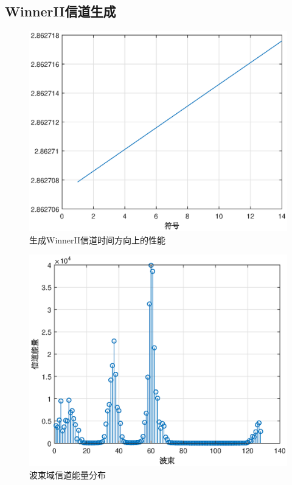 \documentclass{article}
\begin{document}
\subsection{WinnerII信道生成}
\begin{figure}[H]
	\centering
	\includegraphics[width = .7\textwidth]{new.eps}
	\caption{生成WinnerII信道时间方向上的性能}
\end{figure}
\begin{figure}[H]
	\centering
	\includegraphics[width = .7\textwidth]{power.eps}
	\caption{波束域信道能量分布}
\end{figure}

\end{document}
